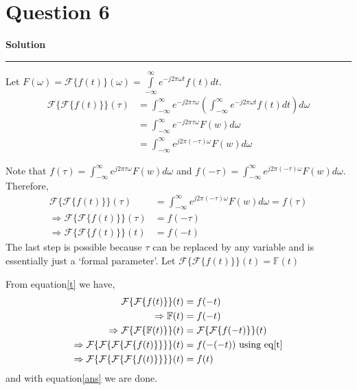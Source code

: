 \documentclass[a4paper]{article}
\title{\cooltitle{CS663 Assignment-3}}
\author{{\bf Saksham Rathi, Kavya Gupta, Shravan Srinivasa Raghavan} \\
\small Department of Computer Science, \\
Indian Institute of Technology Bombay \\}
\date{}
\newenvironment{solution}[2][]{%
    \begin{mdframed}[linecolor=green!60!black, linewidth=2pt, roundcorner=10pt, backgroundcolor=green!5!white, skipabove=12pt, skipbelow=12pt]%
        \textbf{\large #2} %
        \par\noindent\rule{\textwidth}{0.4pt} %
        \vspace{0.5em} %
}{%
    \end{mdframed}%
}
\begin{document}
\maketitle
\section*{Question 6}

\begin{solution}{Solution}
    Let $F(\omega) = \mathcal{F} \{f(t)\}(\omega) = \int\limits_{-\infty}^{\infty} e^{-j2\pi\omega t} f(t)dt$.
    \begin{align*}
        \mathcal{F}\{\mathcal{F}\{f(t)\}\}(\tau) 
        &= \int_{-\infty}^{\infty} e^{-j2\pi\tau\omega} 
        \left( \int_{-\infty}^{\infty} e^{-j2\pi\omega t}f(t) dt \right) d\omega \\
        &= \int_{-\infty}^{\infty} e^{-j2\pi\tau\omega} F(w) d\omega \\
        &= \int_{-\infty}^{\infty} e^{j2\pi(-\tau)\omega} F(w) d\omega
    \end{align*}

    Note that $f(\tau) = \int_{-\infty}^{\infty} e^{j2\pi\tau\omega} F(w) d\omega$ and 
    $f(-\tau) = \int_{-\infty}^{\infty} e^{j2\pi(-\tau)\omega} F(w) d\omega$. Therefore,
    \begin{align}
      \mathcal{F}\{\mathcal{F}\{f(t)\}\}(\tau) &= \int_{-\infty}^{\infty} e^{j2\pi(-\tau)\omega} F(w) d\omega = f(\tau) \nonumber \\
      \Rightarrow \mathcal{F}\{\mathcal{F}\{f(t)\}\}(\tau) &= f(-\tau) \nonumber \\
      \label{t}\Rightarrow \mathcal{F}\{\mathcal{F}\{f(t)\}\}(t) &= f(-t) 
    \end{align}
    The last step is possible because $\tau$ can be replaced by any variable and is essentially just a `formal parameter'. Let
    $\mathcal{F}\{\mathcal{F}\{f(t)\}\}(t) = \mathbb{F}(t)$
    
    From equation\ref{t} we have,
    \begin{align}
      \mathcal{F}\{\mathcal{F}\{f(t)\}\}(t) &= f(-t) \nonumber \\
      \Rightarrow \mathbb{F}(t) &= f(-t) \nonumber \\
      \Rightarrow \mathcal{F}\{\mathcal{F}\{\mathbb{F}(t)\}\}(t) &= \mathcal{F}\{\mathcal{F}\{f(-t)\}\}(t) \nonumber \\
      \Rightarrow \mathcal{F}\{\mathcal{F}\{\mathcal{F}\{\mathcal{F}\{f(t)\}\}\}\}(t) &= f(-(-t)) \text{ using eq\ref{t}}\nonumber \\
      \Rightarrow \label{ans}\mathcal{F}\{\mathcal{F}\{\mathcal{F}\{\mathcal{F}\{f(t)\}\}\}\}(t) &= f(t)
    \end{align}
    and with equation\ref{ans} we are done.


\end{solution}
\end{document}
